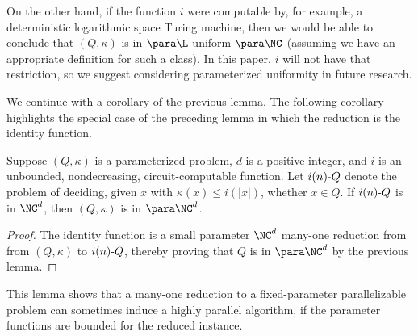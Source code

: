 On the other hand, if the function $i$ were computable by, for example, a deterministic logarithmic space Turing machine, then we would be able to conclude that $(Q, \kappa)$ is in $\para \L$-uniform $\para \NC$ (assuming we have an appropriate definition for such a class).
In this paper, $i$ will not have that restriction, so we suggest considering parameterized uniformity in future research.

We continue with a corollary of the previous lemma.
The following corollary highlights the special case of the preceding lemma in which the reduction is the identity function.

\begin{corollary}\label{cor:sprself}
  Suppose $(Q, \kappa)$ is a parameterized problem, $d$ is a positive integer, and $i$ is an unbounded, nondecreasing, circuit-computable function.
  Let $i(n) \textnormal{-} Q$ denote the problem of deciding, given $x$ with $\kappa(x) \leq i(|x|)$, whether $x \in Q$.
  If $i(n) \textnormal{-} Q$ is in $\NC^d$, then $(Q, \kappa)$ is in $\para \NC^d$.
\end{corollary}
\begin{proof}
  The identity function is a small parameter $\NC^d$ many-one reduction from from $(Q, \kappa)$ to $i(n) \textnormal{-} Q$, thereby proving that $Q$ is in $\para \NC^d$ by the previous lemma.
\end{proof}

This lemma shows that a many-one reduction to a fixed-parameter parallelizable problem can sometimes induce a highly parallel algorithm, if the parameter functions are bounded for the reduced instance.

